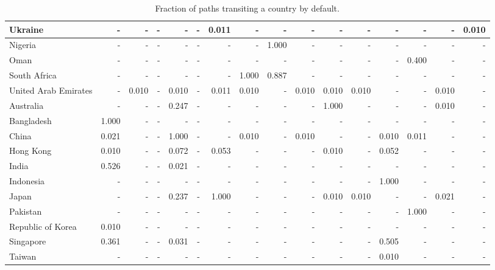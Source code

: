 \documentclass[10pt,twocolumn]{sig-alternate}
\begin{document}
\begin{table*}[t]
\begin{adjustbox}{width=1\textwidth}
\begin{tabular}{@{}ld{3.2}d{3.2}d{3.2}d{3.2}d{3.2}d{3.2}d{3.2}d{3.2}d{3.2}d{3.2}d{3.2}d{3.2}d{3.2}d{3.2}d{3.2}@{}}
Ukraine  & -  & -  & -  & -  & -  & 0.011 & -  & -  & -  & -  & -  & -  & -  & -  & 0.010\\ \hline
Nigeria  & -  & -  & -  & -  & -  & -  & -  & 1.000 & -  & -  & -  & -  & -  & -  & - \\
Oman  & -  & -  & -  & -  & -  & -  & -  & -  & -  & -  & -  & -  & 0.400 & -  & - \\
South Africa  & -  & -  & -  & -  & -  & -  & 1.000 & 0.887 & -  & -  & -  & -  & -  & -  & - \\
United Arab Emirates  & -  & 0.010 & -  & 0.010 & -  & 0.011 & 0.010 & -  & 0.010 & 0.010 & 0.010 & -  & -  & 0.010 & - \\ \hline
Australia  & -  & -  & -  & 0.247 & -  & -  & -  & -  & -  & 1.000 & -  & -  & -  & 0.010 & - \\
Bangladesh  & 1.000 & -  & -  & -  & -  & -  & -  & -  & -  & -  & -  & -  & -  & -  & - \\
China  & 0.021 & -  & -  & 1.000 & -  & -  & 0.010 & -  & 0.010 & -  & -  & 0.010 & 0.011 & -  & - \\
Hong Kong  & 0.010 & -  & -  & 0.072 & -  & 0.053 & -  & -  & -  & 0.010 & -  & 0.052 & -  & -  & - \\
India  & 0.526 & -  & -  & 0.021 & -  & -  & -  & -  & -  & -  & -  & -  & -  & -  & - \\
Indonesia  & -  & -  & -  & -  & -  & -  & -  & -  & -  & -  & -  & 1.000 & -  & -  & - \\
Japan  & -  & -  & -  & 0.237 & -  & 1.000 & -  & -  & -  & 0.010 & 0.010 & -  & -  & 0.021 & - \\
Pakistan  & -  & -  & -  & -  & -  & -  & -  & -  & -  & -  & -  & -  & 1.000 & -  & - \\
Republic of Korea  & 0.010 & -  & -  & -  & -  & -  & -  & -  & -  & -  & -  & -  & -  & -  & - \\
Singapore  & 0.361 & -  & -  & 0.031 & -  & -  & -  & -  & -  & -  & -  & 0.505 & -  & -  & - \\
Taiwan  & -  & -  & -  & -  & -  & -  & -  & -  & -  & -  & -  & 0.010 & -  & -  & - \\ \hline
\end{tabular}
\end{adjustbox}
\caption{Fraction of paths transiting a country by default.}
\label{tab:host}
\end{table*}
\end{document}
